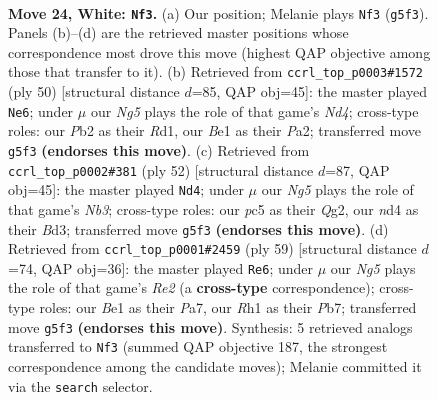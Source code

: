 \documentclass[11pt]{article}
\begin{document}
\clearpage

\begin{figure}[p]\centering
\begin{subfigure}{0.46\textwidth}\centering
\resizebox{\linewidth}{!}{%
\newchessgame
\chessboard[
  setfen={2b1k2r/4q3/5p2/2pp2N1/3n2Pp/1p6/1P1QPPB1/K3B2R w k - 0 24},
  showmover=false,
  pgfstyle=straightmove, color=movearrow, markmove={g5-f3}
]}
\caption{}
\end{subfigure}\hfill
\begin{subfigure}{0.46\textwidth}\centering
\resizebox{\linewidth}{!}{%
\newchessgame
\chessboard[
  setfen={r3k2r/1p1nb3/p1p2q2/2P2B1p/1P1NQ3/8/P4PP1/3RK3 w - - 2 26},
  showmover=false,
  pgfstyle=straightmove, color=movearrow, markmove={d4-e6}
]}
\caption{}
\end{subfigure}
\\[4pt]
\begin{subfigure}{0.46\textwidth}\centering
\resizebox{\linewidth}{!}{%
\newchessgame
\chessboard[
  setfen={r5k1/1pq3p1/4bpR1/p3n2P/P3Pp2/1N1B4/1PP3Q1/1K6 w - - 1 27},
  showmover=false,
  pgfstyle=straightmove, color=movearrow, markmove={b3-d4}
]}
\caption{}
\end{subfigure}\hfill
\begin{subfigure}{0.46\textwidth}\centering
\resizebox{\linewidth}{!}{%
\newchessgame
\chessboard[
  setfen={6k1/ppp1r1b1/5pP1/3Nq2p/4P2P/7Q/P2n2PN/4R1K1 b - - 8 30},
  showmover=false,
  pgfstyle=straightmove, color=movearrow, markmove={e7-e6}
]}
\caption{}
\end{subfigure}
\caption{\textbf{Move 24, White: \texttt{Nf3}.} (a) Our position; Melanie plays \texttt{Nf3} (\texttt{g5f3}). Panels (b)--(d) are the retrieved master positions whose correspondence most drove this move (highest QAP objective among those that transfer to it). (b) Retrieved from \texttt{ccrl\_top\_p0003\#1572} (ply 50) [structural distance $d$=85, QAP obj=45]: the master played \texttt{Ne6}; under $\mu$ our \emph{Ng5} plays the role of that game's \emph{Nd4}; cross-type roles: our \emph{P}b2 as their \emph{R}d1, our \emph{B}e1 as their \emph{P}a2; transferred move \texttt{g5f3} \textbf{(endorses this move)}. (c) Retrieved from \texttt{ccrl\_top\_p0002\#381} (ply 52) [structural distance $d$=87, QAP obj=45]: the master played \texttt{Nd4}; under $\mu$ our \emph{Ng5} plays the role of that game's \emph{Nb3}; cross-type roles: our \emph{p}c5 as their \emph{Q}g2, our \emph{n}d4 as their \emph{B}d3; transferred move \texttt{g5f3} \textbf{(endorses this move)}. (d) Retrieved from \texttt{ccrl\_top\_p0001\#2459} (ply 59) [structural distance $d$=74, QAP obj=36]: the master played \texttt{Re6}; under $\mu$ our \emph{Ng5} plays the role of that game's \emph{Re2} (a \textbf{cross-type} correspondence); cross-type roles: our \emph{B}e1 as their \emph{P}a7, our \emph{R}h1 as their \emph{P}b7; transferred move \texttt{g5f3} \textbf{(endorses this move)}. Synthesis: 5 retrieved analogs transferred to \texttt{Nf3} (summed QAP objective 187, the strongest correspondence among the candidate moves); Melanie committed it via the \texttt{search} selector.}
\label{fig:thought-m46}
\end{figure}
\end{document}
